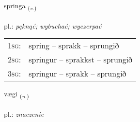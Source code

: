 \documentclass[frontgrid, backgrid]{flacards}\usepackage[]{graphicx}\usepackage[]{xcolor}
\begin{document}
\renewcommand{\flhead}{\vskip5pt \fboxsep=0pt {\small\bfseries\footnotesize Sagnorð | czasownik}}
\renewcommand{\fcfoot}{\vskip5pt \fboxsep=0pt \hspace{2pt}{\small\bfseries\footnotesize 3K}}

\renewcommand{\blhead}{\vskip5pt {\small\bfseries\footnotesize Sagnorð | czasownik }}
\renewcommand{\bcfoot}{\vskip5pt \hspace{2pt}{\small\bfseries\footnotesize 3K}}


{springa \small{\textsubscript{(\textit{v.})}} \\[1ex] %
\textphonetic{[spriŋka]} \\
pl.: \emph{pęknąć; wybuchać; wyczerpać} \\  [2ex]
\renewcommand*{\arraystretch}{0.8}
\begin{tabular}{p{1cm}l}
\textsc{1sg}: & spring -- sprakk -- sprungið \\ 
\textsc{2sg}: & springur -- sprakkst -- sprungið \\ 
\textsc{3sg}: & springur -- sprakk -- sprungið \\ 
\end{tabular}
}

\renewcommand{\flhead}{\vskip5pt \fboxsep=0pt {\small\bfseries\footnotesize Nafnorð | rzeczownik}}
\renewcommand{\fcfoot}{\vskip5pt \fboxsep=0pt \hspace{2pt}{\small\bfseries\footnotesize 3K}}

\renewcommand{\blhead}{\vskip5pt {\small\bfseries\footnotesize Nafnorð | rzeczownik }}
\renewcommand{\bcfoot}{\vskip5pt \hspace{2pt}{\small\bfseries\footnotesize 3K}}


{vægi \small{\textsubscript{(\textit{n.})}} \\[1ex] %
\textphonetic{[vaijɪ]} \\
pl.: \emph{znaczenie} \\  [2ex]
\renewcommand*{\arraystretch}{0.8}
}
\end{document}
